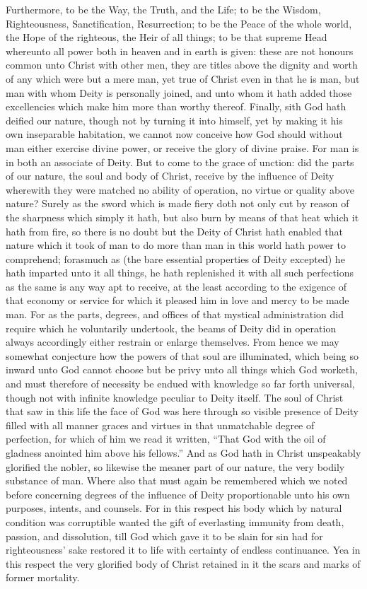 Furthermore, to be the Way, the Truth, and the Life; to be the Wisdom, Righteousness, Sanctification, Resurrection; to be the Peace of the whole world, the Hope of the righteous, the Heir of all things; to be that supreme Head whereunto all power both in heaven and in earth is given: these are not honours common unto Christ with other men, they are titles above the dignity and worth of any which were but a mere man, yet true of Christ even in that he is man, but man with whom Deity is personally joined, and unto whom it hath added those excellencies which make him more than worthy thereof.
Finally, sith God hath deified our nature, though not by turning it into himself, yet by making it his own inseparable habitation, we cannot now conceive how God should without man either exercise divine power, or receive the glory of divine praise. For man is in both an associate of Deity.
But to come to the grace of unction: did the parts of our nature, the soul and body of Christ, receive by the influence  of Deity wherewith they were matched no ability of operation, no virtue or quality above nature? Surely as the sword which is made fiery doth not only cut by reason of the sharpness which simply it hath, but also burn by means of that heat which it hath from fire, so there is no doubt but the Deity of Christ hath enabled that nature which it took of man to do more than man in this world hath power to comprehend; forasmuch as (the bare essential properties of Deity excepted) he hath imparted unto it all things, he hath replenished it with all such perfections as the same is any way apt to receive, at the least according to the exigence of that economy or service for which it pleased him in love and mercy to be made man. For as the parts, degrees, and offices of that mystical administration did require which he voluntarily undertook, the beams of Deity did in operation always accordingly either restrain or enlarge themselves.
From hence we may somewhat conjecture how the powers of that soul are illuminated, which being so inward unto God cannot choose but be privy unto all things which God worketh, and must therefore of necessity be endued with knowledge so far forth universal, though not with infinite knowledge peculiar to Deity itself. The soul of Christ that saw in this life the face of God was here through so visible presence of Deity filled with all manner graces and virtues in that unmatchable degree of perfection, for which of him we read it written, “That God with the oil of gladness anointed him above his fellows.”
And as God hath in Christ unspeakably glorified the nobler, so likewise the meaner part of our nature, the very bodily substance of man. Where also that must again be remembered which we noted before concerning degrees of the  influence of Deity proportionable unto his own purposes, intents, and counsels. For in this respect his body which by natural condition was corruptible wanted the gift of everlasting immunity from death, passion, and dissolution, till God which gave it to be slain for sin had for righteousness’ sake restored it to life with certainty of endless continuance. Yea in this respect the very glorified body of Christ retained in it the scars and marks of former mortality.
